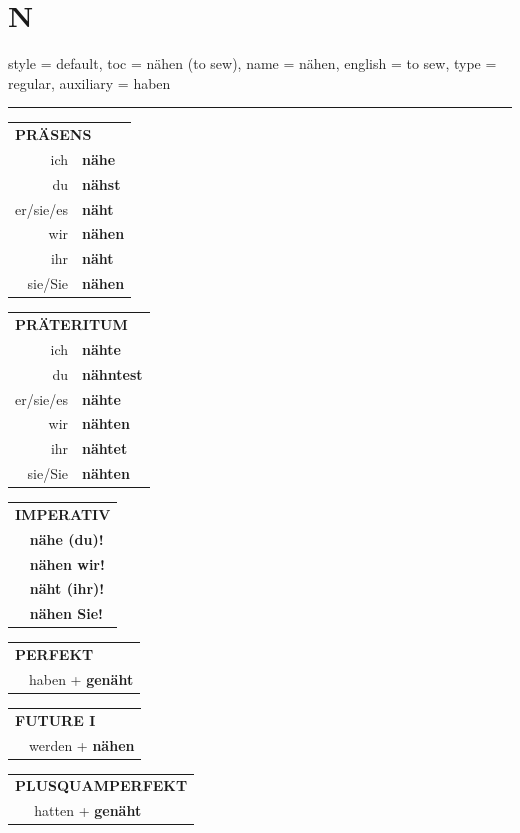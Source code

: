 \section{N}

\begin{verbentry}{
  style = {default},
  toc = {nähen (to sew)},
  name = {nähen},
  english = {to sew},
  type = {regular},
  auxiliary = {haben}
}


\vspace{5pt}
\hrule
\vspace{5pt}

\begin{tabular}{rl}
\multicolumn{2}{l}{\textbf{PRÄSENS}}\\
ich & \textbf{nähe}\\
du & \textbf{nähst}\\
er/sie/es & \textbf{näht}\\
wir & \textbf{nähen}\\
ihr & \textbf{näht}\\
sie/Sie & \textbf{nähen}\\
\end{tabular}
\hfill
\begin{tabular}{rl}
\multicolumn{2}{l}{\textbf{PRÄTERITUM}}\\
ich & \textbf{nähte}\\
du & \textbf{nähntest}\\
er/sie/es & \textbf{nähte}\\
wir & \textbf{nähten}\\
ihr & \textbf{nähtet}\\
sie/Sie & \textbf{nähten}\\
\end{tabular}
\hfill
\begin{tabular}{rl}
\multicolumn{2}{l}{\textbf{IMPERATIV}}\\
& \textbf{nähe (du)!}\\
& \textbf{nähen wir!}\\
& \textbf{näht (ihr)!}\\
& \textbf{nähen Sie!}\\
\end{tabular}

\vspace{10pt}

\begin{tabular}{rl}
\multicolumn{2}{l}{\textbf{PERFEKT}}\\
& haben + \textbf{genäht}\\
\end{tabular}
\hfill
\begin{tabular}{rl}
\multicolumn{2}{l}{\textbf{FUTURE I}}\\
& werden + \textbf{nähen}\\
\end{tabular}
\hfill
\begin{tabular}{rl}
\multicolumn{2}{l}{\textbf{PLUSQUAMPERFEKT}}\\
& hatten + \textbf{genäht}\\
\end{tabular}


\end{verbentry}
